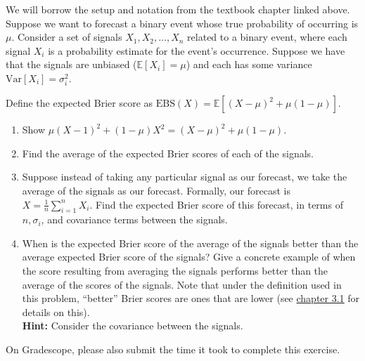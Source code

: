\documentclass[11pt]{article}
\begin{document}
We will borrow the setup and notation from the textbook chapter linked above. Suppose we want to forecast a binary event whose true probability of occurring is $\mu$. Consider a set of signals $X_1, X_2, ..., X_n$ related to a binary event, where each signal $X_i$ is a probability estimate for the event's occurrence. Suppose we have that the signals are unbiased ($\mathbb{E}\left [ X_i \right] = \mu$) and each has some variance $\text{Var}[X_i] = \sigma_i^2$.

Define the expected Brier score as $\text{EBS}(X) = \mathbb{E}[(X - \mu)^2 + \mu(1-\mu)]$.

\begin{enumerate}
    \item Show $\mu (X-1)^2 + (1-\mu) X^2 = (X-\mu)^2 + \mu(1-\mu)$.
    

    \item Find the average of the expected Brier scores of each of the signals.
    
    \item Suppose instead of taking any particular signal as our forecast, we take the average of the signals as our forecast. Formally, our forecast is $X = \frac{1}{n}\sum\limits_{i=1}^{n}X_i$. Find the expected Brier score of this forecast, in terms of $n, \sigma_i$, and covariance terms between the signals.
    
    \item When is the expected Brier score of the average of the signals better than the average expected Brier score of the signals? Give a concrete example of when the score resulting from averaging the signals performs better than the average of the scores of the signals. Note that under the definition used in this problem, ``better'' Brier scores are ones that are lower (see \href{https://forecasting.quarto.pub/book/scoring-rules.html#strictly-proper-scoring-rules}{chapter 3.1} for details on this).\\
    \textbf{Hint: } Consider the covariance between the signals. \\
    
    \end{enumerate}
On Gradescope, please also submit the time it took to complete this exercise.
\end{document}
